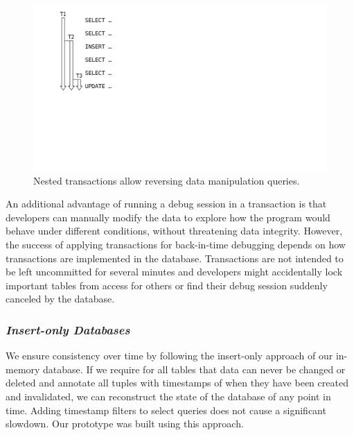 \begin{figure}[t]
\centering
\includegraphics[width=0.3\linewidth]{img/bit_transactions}
\caption{Nested transactions allow reversing data manipulation queries.}
\label{fig:bit_transactions}
\end{figure}

An additional advantage of running a debug session in a transaction is that developers can manually modify the data to explore how the program would behave under different conditions, without threatening data integrity.
However, the success of applying transactions for back-in-time debugging depends on how transactions are implemented in the database.
Transactions are not intended to be left uncommitted for several minutes and developers might accidentally lock important tables from access for others or find their debug session suddenly canceled by the database.

\subsubsection*{\emph{Insert-only Databases}}

\tmpStart

We ensure consistency over time by following the insert-only approach of our in-memory database.
If we require for all tables that data can never be changed or deleted and annotate all tuples with timestamps of when they have been created and invalidated, we can reconstruct the state of the database of any point in time.
Adding timestamp filters to select queries does not cause a significant slowdown.
Our prototype was built using this approach.




